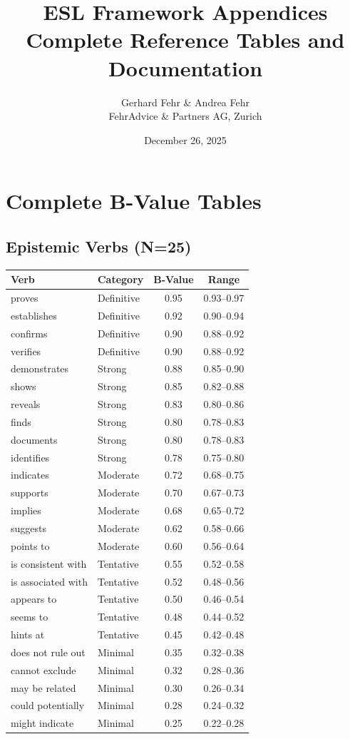 \documentclass[11pt,a4paper]{article}
\title{\textbf{ESL Framework Appendices}\\Complete Reference Tables and Documentation}
\author{Gerhard Fehr \& Andrea Fehr\\FehrAdvice \& Partners AG, Zurich}
\date{December 26, 2025}
\begin{document}
\maketitle
\tableofcontents
\newpage

\appendix

\section{Complete B-Value Tables}

\subsection{Epistemic Verbs (N=25)}

\begin{center}
\begin{tabular}{llcc}
\toprule
\textbf{Verb} & \textbf{Category} & \textbf{B-Value} & \textbf{Range} \\
\midrule
proves & Definitive & 0.95 & 0.93--0.97 \\
establishes & Definitive & 0.92 & 0.90--0.94 \\
confirms & Definitive & 0.90 & 0.88--0.92 \\
verifies & Definitive & 0.90 & 0.88--0.92 \\
demonstrates & Strong & 0.88 & 0.85--0.90 \\
shows & Strong & 0.85 & 0.82--0.88 \\
reveals & Strong & 0.83 & 0.80--0.86 \\
finds & Strong & 0.80 & 0.78--0.83 \\
documents & Strong & 0.80 & 0.78--0.83 \\
identifies & Strong & 0.78 & 0.75--0.80 \\
indicates & Moderate & 0.72 & 0.68--0.75 \\
supports & Moderate & 0.70 & 0.67--0.73 \\
implies & Moderate & 0.68 & 0.65--0.72 \\
suggests & Moderate & 0.62 & 0.58--0.66 \\
points to & Moderate & 0.60 & 0.56--0.64 \\
is consistent with & Tentative & 0.55 & 0.52--0.58 \\
is associated with & Tentative & 0.52 & 0.48--0.56 \\
appears to & Tentative & 0.50 & 0.46--0.54 \\
seems to & Tentative & 0.48 & 0.44--0.52 \\
hints at & Tentative & 0.45 & 0.42--0.48 \\
does not rule out & Minimal & 0.35 & 0.32--0.38 \\
cannot exclude & Minimal & 0.32 & 0.28--0.36 \\
may be related & Minimal & 0.30 & 0.26--0.34 \\
could potentially & Minimal & 0.28 & 0.24--0.32 \\
might indicate & Minimal & 0.25 & 0.22--0.28 \\
\bottomrule
\end{tabular}
\end{center}
\end{document}

